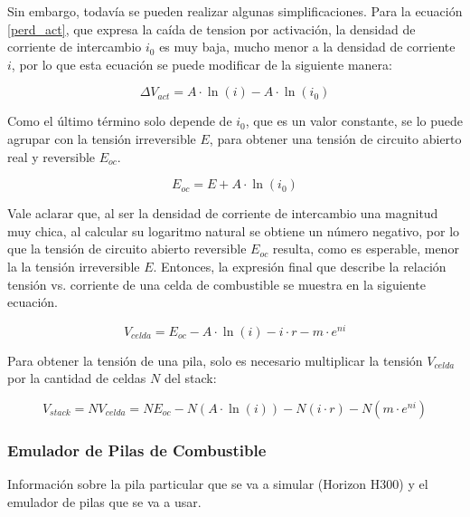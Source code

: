 Sin embargo, todavía se pueden realizar algunas simplificaciones. Para la ecuación \ref{perd_act}, que expresa la caída de tension por activación, la densidad de corriente de intercambio $i_0$ es muy baja, mucho menor a la densidad de corriente $i$, por lo que esta ecuación se puede modificar de la siguiente manera:

\begin{equation}
    \Delta V_{act} = A\cdot \ln(i) - A\cdot \ln(i_0)
\end{equation}

Como el último término solo depende de $i_0$, que es un valor constante, se lo puede agrupar con la tensión irreversible $E$, para obtener una tensión de circuito abierto real y reversible $E_{oc}$.

\begin{equation}
    E_{oc} = E + A\cdot\ln(i_0)
\end{equation}

Vale aclarar que, al ser la densidad de corriente de intercambio una magnitud muy chica, al calcular su logaritmo natural se obtiene un número negativo, por lo que la tensión de circuito abierto reversible $E_{oc}$ resulta, como es esperable, menor la la tensión irreversible $E$. Entonces, la expresión final que describe la relación tensión vs. corriente de una celda de combustible se muestra en la siguiente ecuación.

\begin{equation}\label{v_celda}
    \boxed{V_{celda} = E_{oc} - A\cdot\ln(i) - i\cdot r - m\cdot e^{ni}}
\end{equation}

Para obtener la tensión de una pila, solo es necesario multiplicar la tensión $V_{celda}$ por la cantidad de celdas $N$ del stack:

\begin{equation}\label{v_stack}
    V_{stack} = NV_{celda} = NE_{oc} - N(A\cdot\ln(i)) - N(i\cdot r) - N(m\cdot e^{ni})
\end{equation}

\subsubsection{Emulador de Pilas de Combustible}

Información sobre la pila particular que se va a simular (Horizon H300) y el emulador de pilas que se va a usar.\\